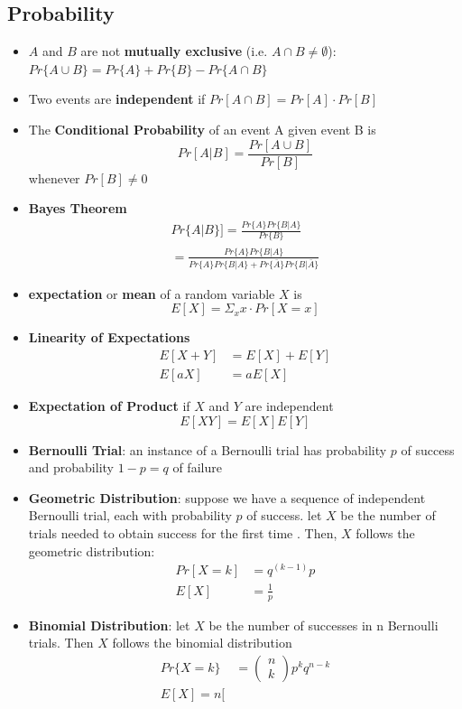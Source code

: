 \documentclass{article}
\begin{document}
\begin{multicols*}{4}
\subsection{Probability}
\begin{itemize}
	\item $A$ and $B$ are not \textbf{mutually exclusive} (i.e. $A \cap B \neq \emptyset$): $Pr\{A \cup B\}=Pr\{A\}+Pr\{B\}-Pr\{A \cap B\}$
	\item Two events are \textbf{independent} if $Pr[A \cap B]=Pr[A] \cdot Pr[B]$
	\item The \textbf{Conditional Probability} of an event A given event B is $$Pr[A\vert B]=\frac{Pr[A\cup B]}{Pr[B]}$$ whenever $Pr[B]\neq 0$
	\item \textbf{Bayes Theorem}
	\begin{align*}
		Pr\{A\vert B\}]=\frac{Pr\{A\} Pr\{B\vert A\}}{Pr\{B \}}\\
		=\frac{Pr\{A\} Pr\{B\vert A\}}{Pr\{A\} Pr\{B\vert A\} + Pr\{\bar{A}\} Pr\{B\vert \bar{A}\}}
	\end{align*}
	\item \textbf{expectation} or \textbf{mean} of a random variable $X$ is
	$$E[X]=\Sigma_x x \cdot Pr[X=x]$$
	\item \textbf{Linearity of Expectations}
		\begin{align*}
			E[X+Y]&=E[X]+E[Y]\\
			E[aX]&=aE[X]
		\end{align*}
	\item \textbf{Expectation of Product} if $X$ and $Y$ are independent $$E[XY]=E[X]E[Y]$$
	\item \textbf{Bernoulli Trial}: an instance of a Bernoulli trial has probability $p$ of success and probability $1-p=q$ of failure
	\item \textbf{Geometric Distribution}: suppose we have a sequence of independent Bernoulli trial, each with probability $p$ of success. let $X$ be the number of trials needed to obtain success for the first time . Then, $X$ follows the geometric distribution:
		\begin{align*}
		Pr[X=k]&=q^(k-1)p\\
		E[X]&=\frac{1}{p}
		\end{align*}
	\item \textbf{Binomial Distribution}: let $X$ be the number of successes in n Bernoulli trials. Then $X$ follows the binomial distribution
		\begin{align*}
			Pr\{X=k\}&=\begin{pmatrix}
							n\\
							k
						\end{pmatrix}p^k q^{n-k}\\
			E[X]=n[
		\end{align*}
\end{itemize}


\end{multicols*}
\end{document}
